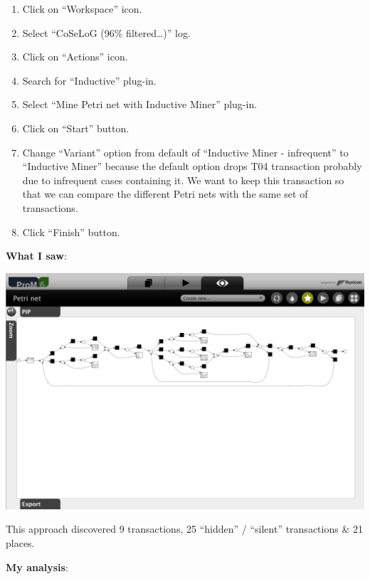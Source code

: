 \documentclass[]{article}
\begin{document}
\begin{enumerate}
\def\labelenumi{\arabic{enumi}.}
\setcounter{enumi}{34}
\itemsep1pt\parskip0pt
\item
  Click on ``Workspace'' icon.\\
\item
  Select ``CoSeLoG (96\% filtered\ldots{})'' log.\\
\item
  Click on ``Actions'' icon.\\
\item
  Search for ``Inductive'' plug-in.\\
\item
  Select ``Mine Petri net with Inductive Miner'' plug-in.\\
\item
  Click on ``Start'' button.
\item
  Change ``Variant'' option from default of ``Inductive Miner -
  infrequent'' to ``Inductive Miner'' because the default option drops
  T04 transaction probably due to infrequent cases containing it. We
  want to keep this transaction so that we can compare the different
  Petri nets with the same set of transactions.\\
\item
  Click ``Finish'' button.
\end{enumerate}

\textbf{What I saw}:

\includegraphics{CoSeLoG_Step_05_Filter96_PetriNet_Inductive.png}

This approach discovered 9 transactions, 25 ``hidden'' / ``silent''
transactions \& 21 places.

\textbf{My analysis}:
\end{document}
